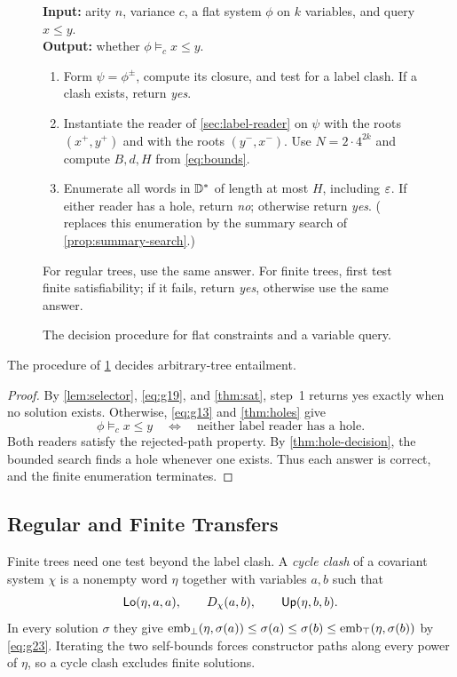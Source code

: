 \begin{figure}[t]
\small
\begin{minipage}{0.94\linewidth}
\textbf{Input:} arity $n$, variance $c$, a flat system $\phi$ on $k$ variables,
and query $x\le y$.\\
\textbf{Output:} whether $\phi\models_c x\le y$.
\begin{enumerate}[leftmargin=*,itemsep=2pt]
\item Form $\psi=\phi^\pm$, compute its closure, and test for a label clash.
If a clash exists, return \emph{yes}.
\item Instantiate the reader of \cref{sec:label-reader} on $\psi$ with the
roots $(x^+,y^+)$ and with the roots $(y^-,x^-)$.
Use $N=2\cdot4^{2k}$ and compute $B,d,H$ from \eqref{eq:bounds}.
\item Enumerate all words in $\mathbb{D}^*$ of length at most $H$, including
$\varepsilon$. If either reader has a hole, return \emph{no}; otherwise return
\emph{yes}. ( replaces this enumeration by the
summary search of \cref{prop:summary-search}.)
\end{enumerate}
For regular trees, use the same answer. For finite trees, first test finite
satisfiability; if it fails, return \emph{yes}, otherwise use the same answer.
\end{minipage}
\caption{The decision procedure for flat constraints and a variable query.}
\label{fig:algorithm}
\end{figure}

\begin{theorem}[Correctness]\label{thm:correct}
The procedure of \cref{fig:algorithm} decides arbitrary-tree entailment.
\end{theorem}
\begin{proof}
By \cref{lem:selector}, \eqref{eq:g19}, and \cref{thm:sat}, step~1 returns yes exactly
when no solution exists. Otherwise, \eqref{eq:g13} and \cref{thm:holes} give
\[
 \phi\models_c x\le y\quad\Longleftrightarrow\quad
 \text{neither label reader has a hole}.
\]
Both readers satisfy the rejected-path property. By
\cref{thm:hole-decision}, the bounded search finds a hole whenever one exists.
Thus each answer is correct, and the finite enumeration terminates.
\end{proof}

\subsection{Regular and Finite Transfers}
Finite trees need one test beyond the label clash. A \emph{cycle clash} of
a covariant system $\chi$ is a nonempty word $\eta$ together with
variables $a,b$ such that
\begin{equation}\label{eq:g55}
 \mathsf{Lo}(\eta,a,a),\qquad D_\chi(a,b),\qquad \mathsf{Up}(\eta,b,b).
\end{equation}
In every solution $\sigma$ they give
$\operatorname{emb}_\bot(\eta,\sigma(a))\le\sigma(a)\le\sigma(b)\le\operatorname{emb}_\top(\eta,\sigma(b))$
by \eqref{eq:g23}. Iterating the two self-bounds forces constructor paths
along every power of $\eta$, so a cycle clash excludes finite solutions.

